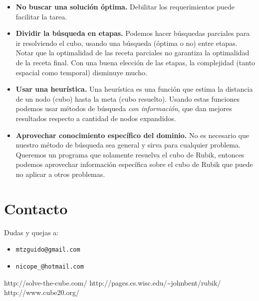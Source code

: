 \documentclass[11pt,a4paper]{article}
\begin{document}
\begin{itemize}
\item \textbf{No buscar una solución óptima.} Debilitar los requerimientos puede facilitar la tarea.
\item \textbf{Dividir la búsqueda en etapas.} Podemos hacer búsquedas parciales para ir resolviendo el cubo, usando una búsqueda (óptima o no) entre etapas. Notar que la optimalidad de las receta parciales no garantiza la optimalidad de la receta final.
Con una buena elección de las etapas, la complejidad (tanto espacial como temporal) disminuye mucho.
\item \textbf{Usar una heurística.} Una heurística es una función que estima la distancia de un nodo (cubo) hasta la meta (cubo resuelto). Usando estas funciones podemos usar métodos de búsqueda \emph{con información}, que dan mejores resultados respecto a cantidad de nodos expandidos.
\item \textbf{Aprovechar conocimiento específico del dominio.} %
No es necesario que nuestro método de búsqueda sea general y sirva para cualquier problema. Queremos un programa que solamente resuelva el cubo de Rubik, entonces podemos aprovechar información específica sobre el cubo de Rubik que puede no aplicar a otros problemas.
\end{itemize}



\section{Contacto}

Dudas y quejas a:
\begin{itemize}
\item \texttt{mtzguido@gmail.com}
\item \texttt{nicope\_@hotmail.com}
\end{itemize}


\begin{thebibliography}{9}

  http://solve-the-cube.com/
  http://pages.cs.wisc.edu/{\textasciitilde}johnbent/rubik/
  http://www.cube20.org/

\end{thebibliography}
\end{document}
